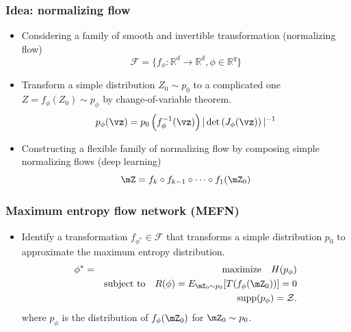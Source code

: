 \documentclass[16pt,presentation]{beamer}
\begin{document}
\begin{frame}
\frametitle{Idea: normalizing flow}
\begin{itemize}
\item Considering a family of smooth and invertible transformation (\alert{normalizing flow}) \[\mathcal{F}=\{f_\phi:  \mathbb{R}^d \rightarrow \mathbb{R}^d, \phi \in \mathbb{R}^q\}\]
\item Transform a simple distribution $Z_0 \sim p_0$ to a complicated one $Z = f_\phi(Z_0) \sim p_\phi$ by \alert{change-of-variable theorem}.
\[p_\phi(\vz) = p_0\left( f_\phi^{-1}(\vz) \right) | \det \left(J_\phi (\vz)\right) |^{-1}\]
\item Constructing a flexible family of normalizing flow by composing simple normalizing flows (\alert{deep learning})
\[\mZ = f_{k}\circ f_{k-1}\circ\dots \circ f_{1}(\mZ_{0})\]
\end{itemize}
\end{frame}

\begin{frame}
\frametitle{Maximum entropy flow network (MEFN)}
\begin{itemize}
\item Identify a transformation $f_{\phi^*} \in \mathcal{F}$ that transforms a simple distribution $p_0$ to approximate the maximum entropy distribution.
\begin{eqnarray*}\label{optobj}
\phi^{*} &=& \text{maximize}~~~ H(p_\phi) \\
&& \text{subject to} ~~~R(\phi) = E_{\mZ_0\sim p_0}[T(f_\phi(\mZ_{0}))]=0 \nonumber\\
&& ~~~~~~~~~~~~~~~~~~\supp(p_\phi)=\mathcal{Z}. \nonumber
\end{eqnarray*}
where $p_\phi$ is the distribution of $f_\phi(\mZ_0)$ for $\mZ_0 \sim p_0$.
\end{itemize}
\end{frame}
\end{document}
